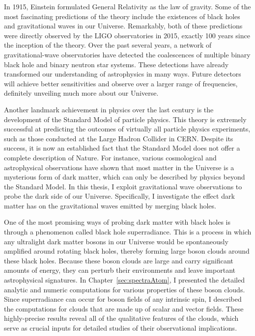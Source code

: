 In 1915, Einstein formulated General Relativity as the law of gravity. Some of the most fascinating predictions of the theory include the existences of black holes and gravitational waves in our Universe. Remarkably, both of these predictions were directly observed by the LIGO observatories in 2015, exactly 100 years since the inception of the theory. Over the past several years, a network of gravitational-wave observatories have detected the coalescences of multiple binary black hole and binary neutron star systems. These detections have already transformed our understanding of astrophysics in many ways. Future detectors will achieve better sensitivities and observe over a larger range of frequencies, definitely unveiling much more about our Universe.


Another landmark achievement in physics over the last century is the development of the Standard Model of particle physics. This theory is extremely successful at predicting the outcomes of virtually all particle physics experiments, such as those conducted at the Large Hadron Collider in CERN. Despite its success, it is now an established fact that the Standard Model does not offer a complete description of Nature. For instance, various cosmological and astrophysical observations have shown that most matter in the Universe is a mysterious form of dark matter, which can only be described by physics beyond the Standard Model. In this thesis, I exploit gravitational wave observations to probe the dark side of our Universe. Specifically, I investigate the effect dark matter has on the gravitational waves emitted by merging black holes.


One of the most promising ways of probing dark matter with black holes is through a phenomenon called black hole superradiance. This is a process in which any ultralight dark matter bosons in our Universe would be spontaneously amplified around rotating black holes, thereby forming large boson clouds around these black holes. Because these boson clouds are large and carry significant amounts of energy, they can perturb their environments and leave important astrophysical signatures. In Chapter~\ref{sec:spectraAtom}, I presented the detailed analytic and numeric computations for various properties of these boson clouds. Since superradiance can occur for boson fields of any intrinsic spin, I described the computations for clouds that are made up of scalar and vector fields. These highly-precise results reveal all of the qualitative features of the clouds, which serve as crucial inputs for detailed studies of their observational implications. 


